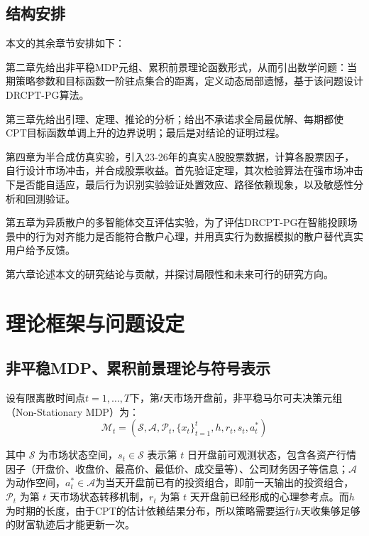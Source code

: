 \documentclass{sufethesismas}
\newcommand{\zhiheng}[1]{{\color{red}{\bf\sf [ZH: #1]}}}
\begin{document}
\section{结构安排}
本文的其余章节安排如下：

第二章先给出非平稳MDP元组、累积前景理论函数形式，从而引出数学问题：当期策略参数和目标函数一阶驻点集合的距离，定义动态局部遗憾，基于该问题设计DRCPT-PG算法。

第三章先给出引理、定理、推论的分析；给出不承诺求全局最优解、每期都使CPT目标函数单调上升的边界说明；最后是对结论的证明过程。

第四章为半合成仿真实验，引入23-26年的真实A股股票数据，计算各股票因子，自行设计市场冲击，并合成股票收益。首先验证定理，其次检验算法在强市场冲击下是否能自适应，最后行为识别实验验证处置效应、路径依赖现象，以及敏感性分析和回测验证。

第五章为异质散户的多智能体交互评估实验，为了评估DRCPT-PG在智能投顾场景中的行为对齐能力是否能符合散户心理，并用真实行为数据模拟的散户替代真实用户给予反馈。

第六章论述本文的研究结论与贡献，并探讨局限性和未来可行的研究方向。

\zhiheng{第一章：现实场景和严格的数学问题，参考飞书写作指南}

\zhiheng{第二章：将prospect theory观点融入bandit/online learning等之后，建立基础的数学结论，可以参考Cumulative
prospect theory meets reinforcement learning: Prediction and control, Risk-Averse Biased Human Policies in Assistive Multi-Armed
Bandit Settings， }

\zhiheng{第三章：仿真实验}
\chapter{理论框架与问题设定}

\section{非平稳MDP、累积前景理论与符号表示}
设有限离散时间点$t=1,\dots,T$下，第$t$天市场开盘前，非平稳马尔可夫决策元组（Non-Stationary MDP）为：
\begin{equation*}
\mathcal{M}_t=(\mathcal{S},\mathcal{A},\mathcal{P}_t,\{x_t\}_{t=1}^{t},h,r_t,s_t,a^*_{t})
\end{equation*}

其中 $\mathcal{S}$ 为市场状态空间，$s_t\in \mathcal{S}$ 表示第 $t$ 日开盘前可观测状态，包含各资产行情因子（开盘价、收盘价、最高价、最低价、成交量等）、公司财务因子等信息；$\mathcal{A}$ 为动作空间，$a_{t}^* \in \mathcal{A}$为当天开盘前已有的投资组合，即前一天输出的投资组合，$\mathcal{P}_t$ 为第 $t$ 天市场状态转移机制，$r_t$ 为第 $t$ 天开盘前已经形成的心理参考点。而$h$为时期的长度，由于CPT的估计依赖结果分布，所以策略需要运行$h$天收集够足够的财富轨迹后才能更新一次。
\end{document}
